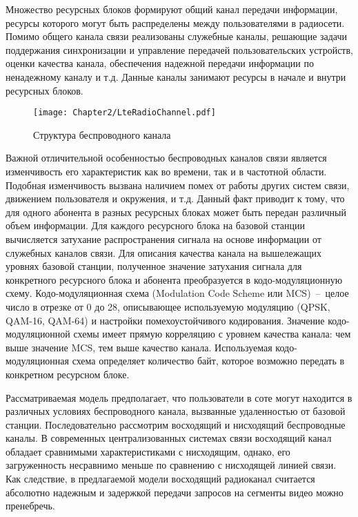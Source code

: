 Множество ресурсных блоков формируют общий канал передачи информации, ресурсы которого могут быть распределены между пользователями в радиосети. Помимо общего канала связи реализованы служебные каналы, решающие задачи поддержания синхронизации и управление передачей пользовательских устройств, оценки качества канала, обеспечения надежной передачи информации по ненадежному каналу и т.д. Данные каналы занимают ресурсы в начале и внутри ресурсных блоков.

\begin{figure}[htbp]
\begin{center}
\texttt{[image: Chapter2/LteRadioChannel.pdf]}
\caption{Структура беспроводного канала}
\label{fig:LteRadioChannel}
\end{center}
\end{figure}

Важной отличительной особенностью беспроводных каналов связи является изменчивость его характеристик как во времени, так и в частотной области. Подобная изменчивость вызвана наличием помех от работы других систем связи, движением пользователя и окружения, и т.д. Данный факт приводит к тому, что для одного абонента в разных ресурсных блоках может быть передан различный объем информации. Для каждого ресурсного блока на базовой станции вычисляется затухание распространения сигнала на основе информации от служебных каналов связи. Для описания качества канала на вышележащих уровнях базовой станции, полученное значение затухания сигнала для конкретного ресурсного блока и абонента преобразуется в кодо-модуляционную схему. Кодо-модуляционная схема (Modulation Code Scheme или MCS)~--~целое число в отрезке от 0 до 28, описывающее используемую модуляцию (QPSK, QAM-16, QAM-64) и настройки помехоустойчивого кодирования. Значение кодо-модуляционной схемы имеет прямую корреляцию с уровнем качества канала: чем выше значение MCS, тем выше качество канала. Используемая кодо-модуляционная схема определяет количество байт, которое возможно передать в конкретном ресурсном блоке.

Рассматриваемая модель предполагает, что пользователи в соте могут находится в различных условиях беспроводного канала, вызванные удаленностью от базовой станции. Последовательно рассмотрим восходящий и нисходящий беспроводные каналы. В современных централизованных системах связи восходящий канал обладает сравнимыми характеристиками с нисходящим, однако, его загруженность несравнимо меньше по сравнению с нисходящей линией связи. Как следствие, в предлагаемой модели восходящий радиоканал считается абсолютно надежным и задержкой передачи запросов на сегменты видео можно пренебречь.

